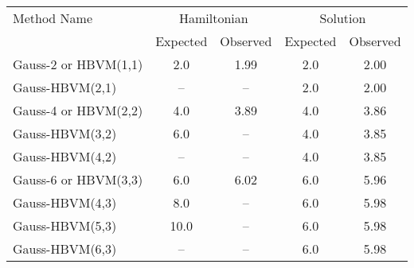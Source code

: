 \begin{tabular}{l|cccc}
\toprule
         Method Name & \multicolumn{2}{c}{Hamiltonian} & \multicolumn{2}{c}{Solution} \\
                     &    Expected & Observed & Expected & Observed \\
\midrule
Gauss-2 or HBVM(1,1) &         2.0 &     1.99 &      2.0 &     2.00 \\
     Gauss-HBVM(2,1) &          -- &       -- &      2.0 &     2.00 \\
Gauss-4 or HBVM(2,2) &         4.0 &     3.89 &      4.0 &     3.86 \\
     Gauss-HBVM(3,2) &         6.0 &       -- &      4.0 &     3.85 \\
     Gauss-HBVM(4,2) &          -- &       -- &      4.0 &     3.85 \\
Gauss-6 or HBVM(3,3) &         6.0 &     6.02 &      6.0 &     5.96 \\
     Gauss-HBVM(4,3) &         8.0 &       -- &      6.0 &     5.98 \\
     Gauss-HBVM(5,3) &        10.0 &       -- &      6.0 &     5.98 \\
     Gauss-HBVM(6,3) &          -- &       -- &      6.0 &     5.98 \\
\bottomrule
\end{tabular}
